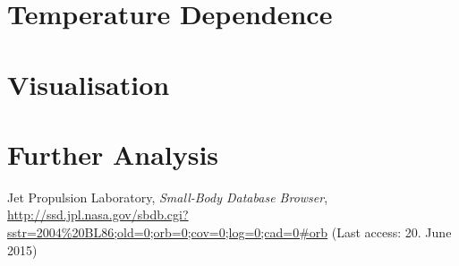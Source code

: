 \documentclass[11pt, a4paper]{article}
\numberwithin{equation}{section}
\begin{document}
\section{Temperature Dependence} \label{Sec:Temperature}
\section{Visualisation} \label{Sec:Visualisation}
\section{Further Analysis} \label{Sec:Further_Analysis}

\FloatBarrier
\vspace{\fill}
\begin{thebibliography}{9}
	Jet Propulsion Laboratory,
	\emph{Small-Body Database Browser},\\
	\url{http://ssd.jpl.nasa.gov/sbdb.cgi?sstr=2004%20BL86;old=0;orb=0;cov=0;log=0;cad=0#orb} (Last access: 20. June 2015)
\end{thebibliography}
\end{document}
